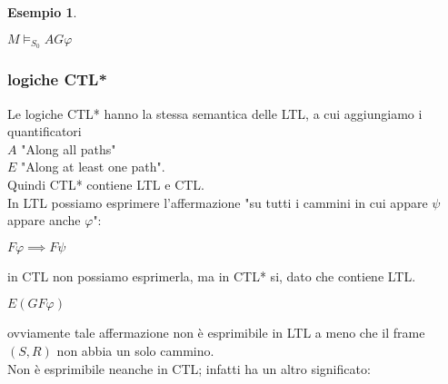 \documentclass[a4paper,12pt]{article}
\theoremstyle{def}
\theoremstyle{prop}
\theoremstyle{esempio}
\newtheorem*{example}{Esempio}
\theoremstyle{dimostrazione}
\theoremstyle{teo}
\theoremstyle{osservazione}
\begin{document}
\begin{example}
\begin{center}
		\(M \vDash_{S_0} AG \varphi\)\\
	\end{center}
\end{example}
\newpage
\subsubsection{logiche CTL*}
Le logiche CTL* hanno la stessa semantica delle LTL, a cui aggiungiamo i quantificatori\\
\(A\) "Along all paths"\\
\(E\) "Along at least one path".\\
Quindi CTL* contiene LTL e CTL.\\
In LTL possiamo esprimere l'affermazione "su tutti i cammini in cui appare \(\psi\) appare anche \(\varphi\)":
\begin{center}
	\(F\varphi \implies F \psi\)
\end{center}
in CTL non possiamo esprimerla, ma in CTL* si, dato che contiene LTL.\\
\begin{center}
	\(E(GF\varphi)\)
\end{center}
ovviamente tale affermazione non è esprimibile in LTL a meno che il frame \((S,R)\) non abbia un solo cammino.\\
Non è esprimibile neanche in CTL; infatti ha un altro significato:
\end{document}
